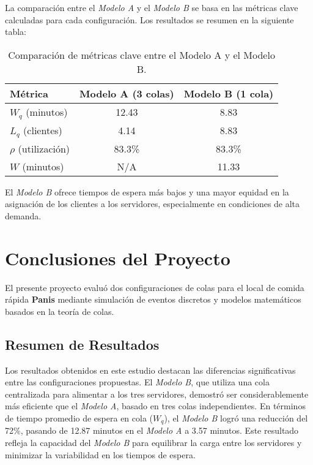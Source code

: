 \documentclass[a4paper,12pt]{article}
\begin{document}
La comparación entre el \textit{Modelo A} y el \textit{Modelo B} se basa en las métricas clave calculadas para cada configuración. Los resultados se resumen en la siguiente tabla:

\begin{table}[h!]
\centering
\begin{tabular}{|l|c|c|}
\hline
\textbf{Métrica}                  & \textbf{Modelo A (3 colas)} & \textbf{Modelo B (1 cola)} \\ \hline
\( W_q \) (minutos)               & 12.43                      & 8.83                       \\ \hline
\( L_q \) (clientes)              & 4.14                       & 8.83                       \\ \hline
\( \rho \) (utilización)          & 83.3\%                     & 83.3\%                     \\ \hline
\( W \) (minutos)                 & N/A                        & 11.33                      \\ \hline
\end{tabular}
\caption{Comparación de métricas clave entre el Modelo A y el Modelo B.}
\end{table}

El \textit{Modelo B} ofrece tiempos de espera más bajos y una mayor equidad en la asignación de los clientes a los servidores, especialmente en condiciones de alta demanda. 

\section{Conclusiones del Proyecto}

El presente proyecto evaluó dos configuraciones de colas para el local de comida rápida \textbf{Panis} mediante simulación de eventos discretos y modelos matemáticos basados en la teoría de colas. 

\subsection{Resumen de Resultados}

Los resultados obtenidos en este estudio destacan las diferencias significativas entre las configuraciones propuestas. El \textit{Modelo B}, que utiliza una cola centralizada para alimentar a los tres servidores, demostró ser considerablemente más eficiente que el \textit{Modelo A}, basado en tres colas independientes. En términos de tiempo promedio de espera en cola (\( W_q \)), el \textit{Modelo B} logró una reducción del 72\%, pasando de 12.87 minutos en el \textit{Modelo A} a 3.57 minutos. Este resultado refleja la capacidad del \textit{Modelo B} para equilibrar la carga entre los servidores y minimizar la variabilidad en los tiempos de espera.
\end{document}
